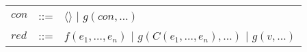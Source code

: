\begin{tabular}{l r l}
$con$ & ::= & $\langle\rangle$
			$\mid$ $g(con, \ldots)$\\
$red$ & ::= & $f(e_1, \ldots, e_n)$
			$\mid$ $g(C(e_1, \ldots, e_n), \ldots)$
			$\mid$ $g(v, \ldots)$
\end{tabular}